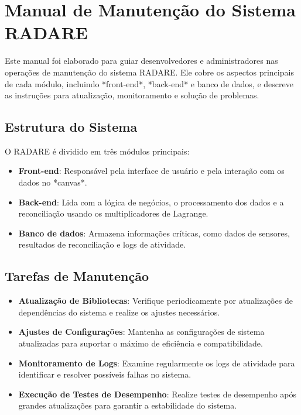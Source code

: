 \label{Cap:manualManutencao}

\section*{Manual de Manutenção do Sistema RADARE}

Este manual foi elaborado para guiar desenvolvedores e administradores nas operações de manutenção do sistema RADARE. Ele cobre os aspectos principais de cada módulo, incluindo *front-end*, *back-end* e banco de dados, e descreve as instruções para atualização, monitoramento e solução de problemas.

\subsection*{Estrutura do Sistema}

O RADARE é dividido em três módulos principais:
\begin{itemize}
    \item \textbf{Front-end}: Responsável pela interface de usuário e pela interação com os dados no *canvas*.
    \item \textbf{Back-end}: Lida com a lógica de negócios, o processamento dos dados e a reconciliação usando os multiplicadores de Lagrange.
    \item \textbf{Banco de dados}: Armazena informações críticas, como dados de sensores, resultados de reconciliação e logs de atividade.
\end{itemize}

\subsection*{Tarefas de Manutenção}

\begin{itemize}
    \item \textbf{Atualização de Bibliotecas}: Verifique periodicamente por atualizações de dependências do sistema e realize os ajustes necessários.
    \item \textbf{Ajustes de Configurações}: Mantenha as configurações de sistema atualizadas para suportar o máximo de eficiência e compatibilidade.
    \item \textbf{Monitoramento de Logs}: Examine regularmente os logs de atividade para identificar e resolver possíveis falhas no sistema.
    \item \textbf{Execução de Testes de Desempenho}: Realize testes de desempenho após grandes atualizações para garantir a estabilidade do sistema.
\end{itemize}

